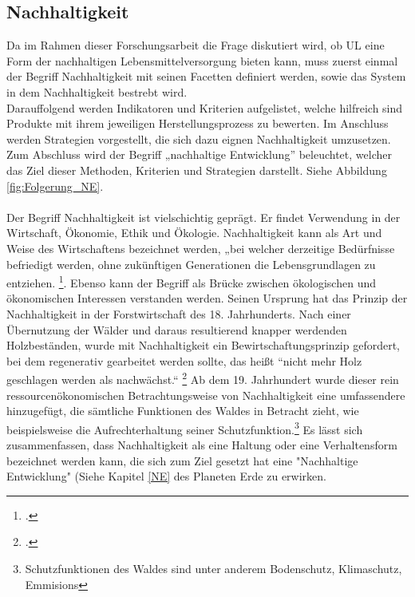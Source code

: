 \documentclass{scrartcl}
\begin{document}
\subsection{Nachhaltigkeit}
Da im Rahmen dieser Forschungsarbeit die Frage diskutiert wird, ob UL eine Form der nachhaltigen Lebensmittelversorgung bieten kann, muss zuerst einmal der Begriff Nachhaltigkeit mit seinen Facetten definiert werden, sowie das System in dem Nachhaltigkeit bestrebt wird.\\
Darauffolgend werden Indikatoren und Kriterien aufgelistet, welche hilfreich sind Produkte mit ihrem jeweiligen Herstellungsprozess zu bewerten. Im Anschluss werden Strategien vorgestellt, die sich dazu eignen Nachhaltigkeit umzusetzen.
Zum Abschluss wird der Begriff „nachhaltige Entwicklung” beleuchtet, welcher das Ziel dieser Methoden, Kriterien und Strategien darstellt. Siehe Abbildung \ref{fig:Folgerung_NE}.
\\
\\
Der Begriff Nachhaltigkeit ist vielschichtig geprägt. Er findet Verwendung in der Wirtschaft, Ökonomie, Ethik und Ökologie. Nachhaltigkeit kann als Art und Weise des Wirtschaftens bezeichnet werden, „bei welcher derzeitige Bedürfnisse befriedigt werden, ohne zukünftigen Generationen die Lebensgrundlagen zu entziehen. \footcite{DefinitionWirtschaftslexikonb}. Ebenso kann der Begriff als Brücke zwischen ökologischen und ökonomischen Interessen verstanden werden. Seinen Ursprung hat das Prinzip der Nachhaltigkeit in der Forstwirtschaft des 18. Jahrhunderts. Nach einer Übernutzung der Wälder und daraus resultierend knapper werdenden Holzbeständen, wurde mit Nachhaltigkeit ein Bewirtschaftungsprinzip gefordert, bei dem regenerativ gearbeitet werden sollte, das heißt “nicht mehr Holz geschlagen werden als nachwächst.“ \footcite{NachhaltigeBrockhaus.de}
Ab dem 19. Jahrhundert wurde dieser rein ressourcenökonomischen Betrachtungsweise von Nachhaltigkeit eine umfassendere hinzugefügt, die sämtliche Funktionen des Waldes in Betracht zieht, wie beispielsweise die Aufrechterhaltung seiner Schutzfunktion.\footnote{Schutzfunktionen des Waldes sind unter anderem Bodenschutz, Klimaschutz, Emmisions}
Es lässt sich zusammenfassen, dass Nachhaltigkeit als eine Haltung oder eine Verhaltensform bezeichnet werden kann, die sich zum Ziel gesetzt hat eine "Nachhaltige Entwicklung" (Siehe Kapitel \ref{NE} des Planeten Erde zu erwirken.
\end{document}
